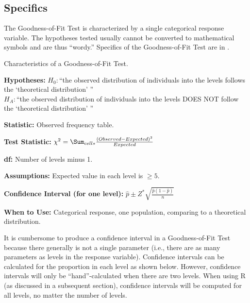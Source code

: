\documentclass[10pt,openany]{book}\usepackage[]{graphicx}\usepackage[]{color}
\begin{document}
\subsection{Specifics}
The Goodness-of-Fit Test is characterized by a single categorical response variable. The hypotheses tested usually cannot be converted to mathematical symbols and are thus ``wordy.''  Specifics of the Goodness-of-Fit Test are in .

\begin{table}[h]
\centering
\colorbox{ltgray}{
\begin{minipage}{.8\textwidth}
  \centering
	\caption{Characteristics of a Goodness-of-Fit Test.}\label{tab:ChiGOFspec}
  \begin{Itemize}
      \item \textbf{Hypotheses:} $H_{0}:$``the observed distribution of individuals into the levels follows the `theoretical distribution' ''\\ $H_{A}:$``the observed distribution of individuals into the levels DOES NOT follow the `theoretical distribution' ''
      \item \textbf{Statistic:} Observed frequency table.
      \vspace{6pt}
      \item \textbf{Test Statistic:} $\chi^{2} = \Sum_{cells}\frac{(Observed-Expected)^{2}}{Expected}$
      \vspace{6pt}
      \item \textbf{df:} Number of levels minus 1.
      \item \textbf{Assumptions:} Expected value in each level is $\geq5$.
      \vspace{6pt}
      \item \textbf{Confidence Interval (for one level):} $\hat{p} \pm Z^{*}\sqrt{\frac{\hat{p}(1-\hat{p})}{n}}$
      \vspace{6pt}
      \item \textbf{When to Use:} Categorical response, one population, comparing to a theoretical distribution.
  \end{Itemize}
\end{minipage}}
\end{table}

It is cumbersome to produce a confidence interval in a Goodness-of-Fit Test because there generally is not a single parameter (i.e., there are as many parameters as levels in the response variable). Confidence intervals can be calculated for the proportion in each level as shown below. However, confidence intervals will only be ``hand''-calculated when there are two levels. When using R (as discussed in a subsequent section), confidence intervals will be computed for all levels, no matter the number of levels.
\end{document}
